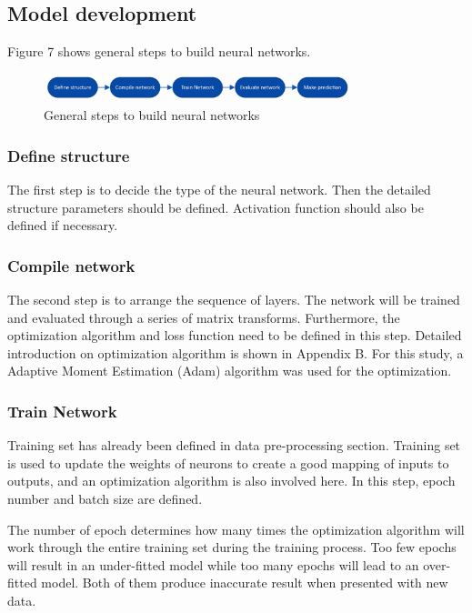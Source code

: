 \subsection{Model development}
Figure 7 shows general steps to build neural networks.

\begin{figure}[]
\centering
\includegraphics[width=0.8\textwidth]{figures/visio.png}
\caption{General steps to build neural networks}
\label{fig:B-B1}
\end{figure}

\subsubsection{Define structure}
The first step is to decide the type of the neural network. Then the detailed structure parameters should be defined. Activation function should also be defined if necessary.

\subsubsection{Compile network}
The second step is to arrange the sequence of layers. The network will be trained and evaluated through a series of matrix transforms. Furthermore, the optimization algorithm and loss function need to be defined in this step. Detailed introduction on optimization algorithm is shown in Appendix B. For this study, a Adaptive Moment Estimation (Adam) algorithm was used for the optimization.

\subsubsection{Train Network}
Training set has already been defined in data pre-processing section. Training set is used to update the weights of neurons to create a good mapping of inputs to outputs, and an optimization algorithm is also involved here. In this step, epoch number and batch size are defined.

The number of epoch determines how many times the optimization algorithm will work through the entire training set during the training process. Too few epochs will result in an under-fitted model while too many epochs will lead to an over-fitted model. Both of them produce inaccurate result when presented with new data.

